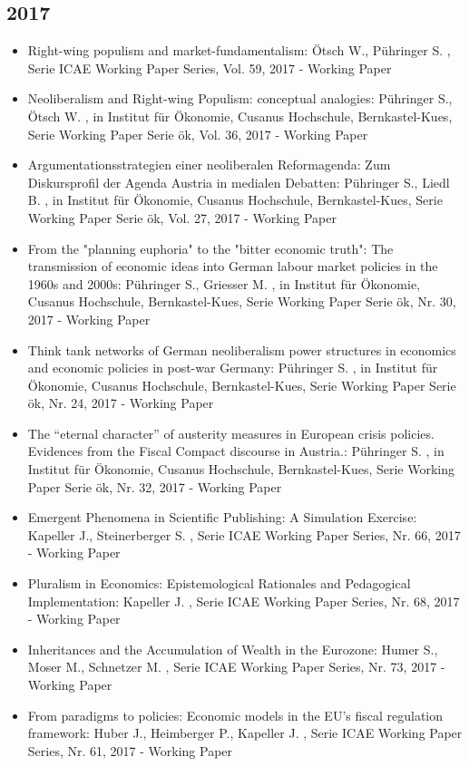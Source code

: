  \subsection{2017} 
 \begin{itemize} 
	 \item Right-wing populism and market-fundamentalism: Ötsch W., Pühringer S. , Serie ICAE Working Paper Series, Vol. 59, 2017 - Working Paper
	 \item Neoliberalism and Right-wing Populism: conceptual analogies: Pühringer S., Ötsch W. , in Institut für Ökonomie, Cusanus Hochschule, Bernkastel-Kues, Serie Working Paper Serie ök, Vol. 36, 2017 - Working Paper
	 \item Argumentationsstrategien einer neoliberalen Reformagenda: Zum Diskursprofil der Agenda Austria in medialen Debatten: Pühringer S., Liedl B. , in Institut für Ökonomie, Cusanus Hochschule, Bernkastel-Kues, Serie Working Paper Serie ök, Vol. 27, 2017 - Working Paper
	 \item From the "planning euphoria" to the "bitter economic truth": The transmission of economic ideas into German labour market policies in the 1960s and 2000s: Pühringer S., Griesser M. , in Institut für Ökonomie, Cusanus Hochschule, Bernkastel-Kues, Serie Working Paper Serie ök, Nr. 30, 2017 - Working Paper
	 \item Think tank networks of German neoliberalism power structures in economics and economic policies in post-war Germany: Pühringer S. , in Institut für Ökonomie, Cusanus Hochschule, Bernkastel-Kues, Serie Working Paper Serie ök, Nr. 24, 2017 - Working Paper
	 \item The “eternal character” of austerity measures in European crisis policies. Evidences from the Fiscal Compact discourse in Austria.: Pühringer S. , in Institut für Ökonomie, Cusanus Hochschule, Bernkastel-Kues, Serie Working Paper Serie ök, Nr. 32, 2017 - Working Paper
	 \item Emergent Phenomena in Scientific Publishing: A Simulation Exercise: Kapeller J., Steinerberger S. , Serie ICAE Working Paper Series, Nr. 66, 2017 - Working Paper
	 \item Pluralism in Economics: Epistemological Rationales and Pedagogical Implementation: Kapeller J. , Serie ICAE Working Paper Series, Nr. 68, 2017 - Working Paper
	 \item Inheritances and the Accumulation of Wealth in the Eurozone: Humer S., Moser M., Schnetzer M. , Serie ICAE Working Paper Series, Nr. 73, 2017 - Working Paper
	 \item From paradigms to policies: Economic models in the EU’s fiscal regulation framework: Huber J., Heimberger P., Kapeller J. , Serie ICAE Working Paper Series, Nr. 61, 2017 - Working Paper

\end{itemize}
